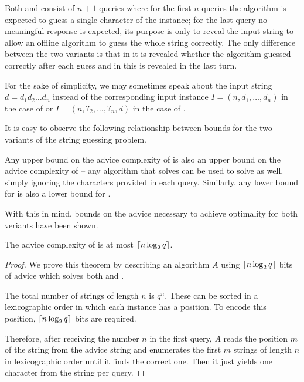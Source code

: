 Both  and  consist of $n + 1$ queries where for the first
$n$ queries the algorithm is expected to guess a single character of the
instance; for the last query no meaningful response is expected, its
purpose is only to reveal the input string to allow an offline algorithm
to guess the whole string correctly. The only difference between the two
variants is that in  it is revealed whether the algorithm guessed
correctly after each guess and in  this is revealed in the last
turn.

For the sake of simplicity, we may sometimes speak about the input string
$d = d_1d_2\dots{}d_n$ instead of the corresponding input instance $I =
(n, d_1, \dots, d_n)$ in the case of  or $I = (n, ?_2, \dots, ?_n,
d)$ in the case of .

It is easy to observe the following relationship between bounds for the
two variants of the string guessing problem.

\begin{observation}\label{observation:sguh-sgkh-bounds}
    Any upper bound on the advice complexity of  is also an upper
    bound on the advice complexity of  -- any algorithm that
    solves  can be used to solve  as well, simply ignoring
    the characters provided in each query. Similarly, any lower bound for
     is also a lower bound for .
\end{observation}

With this in mind, bounds on the advice necessary to achieve optimality
for both veriants have been shown.

\begin{theorem}\label{theorem:sgkh-upper}\label{theorem:sguh-upper}
    The advice complexity of  is at most $\lceil n \log_2 q\rceil$.
\end{theorem}

\begin{proof}
    We prove this theorem by describing an algorithm $A$ using $\lceil n
    \log_2 q\rceil$ bits of advice which solves both  and .

    The total number of strings of length $n$ is $q^n$. These can be
    sorted in a lexicographic order in which each instance has a position.
    To encode this position, $\lceil n \log_2 q\rceil$ bits are required.

    Therefore, after receiving the number $n$ in the first query, $A$
    reads the position $m$ of the string from the advice string and
    enumerates the first $m$ strings of length $n$ in lexicographic order
    until it finds the correct one. Then it just yields one character from
    the string per query.
\end{proof}


